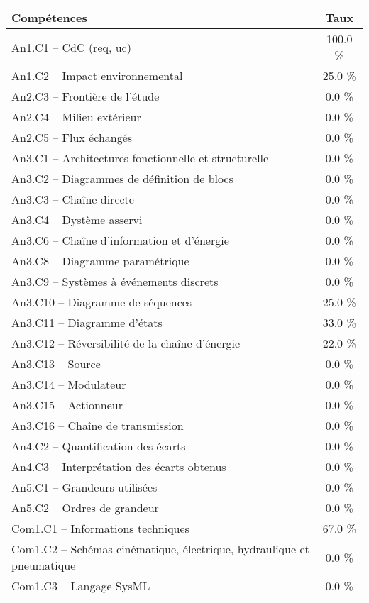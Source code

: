 \footnotesize 
\begin{center} 
\begin{tabular}{|p{.7\linewidth}|c|} 
\hline 
Compétences  & Taux \\ \hline \hline 
An1.C1 -- CdC (req, uc)&100.0 \% \\ \hline 
An1.C2 -- Impact environnemental&25.0 \% \\ \hline 
An2.C3 -- Frontière de l’étude&0.0 \% \\ \hline 
An2.C4 -- Milieu extérieur&0.0 \% \\ \hline 
An2.C5 -- Flux échangés&0.0 \% \\ \hline 
An3.C1 -- Architectures fonctionnelle et structurelle&0.0 \% \\ \hline 
An3.C2 -- Diagrammes de définition de blocs&0.0 \% \\ \hline 
An3.C3 -- Chaîne directe&0.0 \% \\ \hline 
An3.C4 -- Dystème asservi&0.0 \% \\ \hline 
An3.C6 -- Chaîne d’information et d'énergie&0.0 \% \\ \hline 
An3.C8 -- Diagramme paramétrique&0.0 \% \\ \hline 
An3.C9 -- Systèmes à événements discrets&0.0 \% \\ \hline 
An3.C10 -- Diagramme de séquences&25.0 \% \\ \hline 
An3.C11 -- Diagramme d’états&33.0 \% \\ \hline 
An3.C12 -- Réversibilité de la chaîne d’énergie&22.0 \% \\ \hline 
An3.C13 -- Source&0.0 \% \\ \hline 
An3.C14 -- Modulateur&0.0 \% \\ \hline 
An3.C15 -- Actionneur&0.0 \% \\ \hline 
An3.C16 -- Chaîne de transmission&0.0 \% \\ \hline 
An4.C2 -- Quantification des écarts&0.0 \% \\ \hline 
An4.C3 -- Interprétation des écarts obtenus&0.0 \% \\ \hline 
An5.C1 -- Grandeurs utilisées &0.0 \% \\ \hline 
An5.C2 -- Ordres de grandeur&0.0 \% \\ \hline 
Com1.C1 -- Informations techniques&67.0 \% \\ \hline 
Com1.C2 -- Schémas cinématique, électrique, hydraulique et pneumatique&0.0 \% \\ \hline 
Com1.C3 -- Langage SysML&0.0 \% \\ \hline 

\end{tabular}
\end{center}
